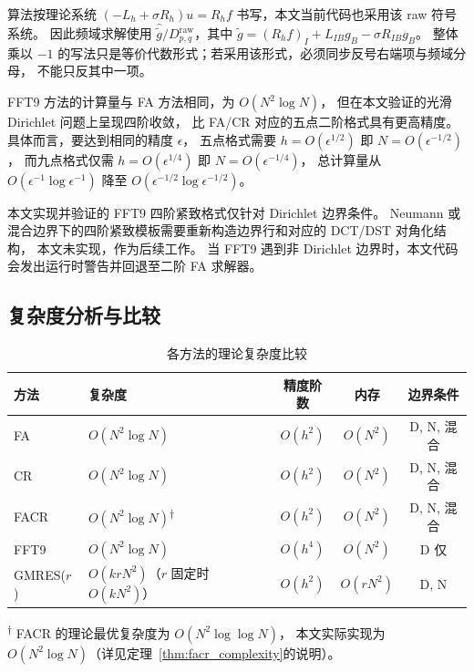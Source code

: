 \begin{remark}
算法按理论系统 $(-L_h+\sigma R_h)u=R_hf$ 书写，本文当前代码也采用该 raw 符号系统。
因此频域求解使用 $\hat{\tilde g}/D_{p,q}^{\mathrm{raw}}$，其中
$\tilde g=(R_h f)_I+L_{IB}g_B-\sigma R_{IB}g_B$。
整体乘以 $-1$ 的写法只是等价代数形式；若采用该形式，必须同步反号右端项与频域分母，
不能只反其中一项。
\end{remark}

FFT9 方法的计算量与 FA 方法相同，为 $O(N^2 \log N)$，
但在本文验证的光滑 Dirichlet 问题上呈现四阶收敛，
比 FA/CR 对应的五点二阶格式具有更高精度。
具体而言，要达到相同的精度 $\epsilon$，
五点格式需要 $h = O(\epsilon^{1/2})$ 即 $N = O(\epsilon^{-1/2})$，
而九点格式仅需 $h = O(\epsilon^{1/4})$ 即 $N = O(\epsilon^{-1/4})$，
总计算量从 $O(\epsilon^{-1}\log\epsilon^{-1})$ 降至 $O(\epsilon^{-1/2}\log\epsilon^{-1/2})$。

\begin{remark}
  本文实现并验证的 FFT9 四阶紧致格式仅针对 Dirichlet 边界条件。
  Neumann 或混合边界下的四阶紧致模板需要重新构造边界行和对应的 DCT/DST 对角化结构，
  本文未实现，作为后续工作。
  当 FFT9 遇到非 Dirichlet 边界时，本文代码会发出运行时警告并回退至二阶 FA 求解器。
\end{remark}

\subsection{复杂度分析与比较}

\begin{table}[H]
\centering
\caption{各方法的理论复杂度比较}
\label{tab:complexity}
\begin{tabularx}{\textwidth}{l>{\raggedright\arraybackslash}Xccc}
\toprule
方法 & 复杂度 & 精度阶数 & 内存 & 边界条件 \\
\midrule
FA    & $O(N^2 \log N)$    & $O(h^2)$ & $O(N^2)$ & D, N, 混合 \\
CR    & $O(N^2 \log N)$    & $O(h^2)$ & $O(N^2)$ & D, N, 混合 \\
FACR  & $O(N^2 \log N)$\textsuperscript{$\dagger$} & $O(h^2)$ & $O(N^2)$ & D, N, 混合 \\
FFT9  & $O(N^2 \log N)$    & $O(h^4)$ & $O(N^2)$ & D\textrm{ 仅} \\
GMRES($r$) & $O(krN^2)$（$r$ 固定时 $O(kN^2)$） & $O(h^2)$ & $O(rN^2)$  & D, N \\
\bottomrule
\end{tabularx}
\vspace{0.5em}

\noindent\textsuperscript{$\dagger$} FACR 的理论最优复杂度为 $O(N^2\log\log N)$，
本文实际实现为 $O(N^2\log N)$（详见定理~\ref{thm:facr_complexity}的说明）。
\end{table}

